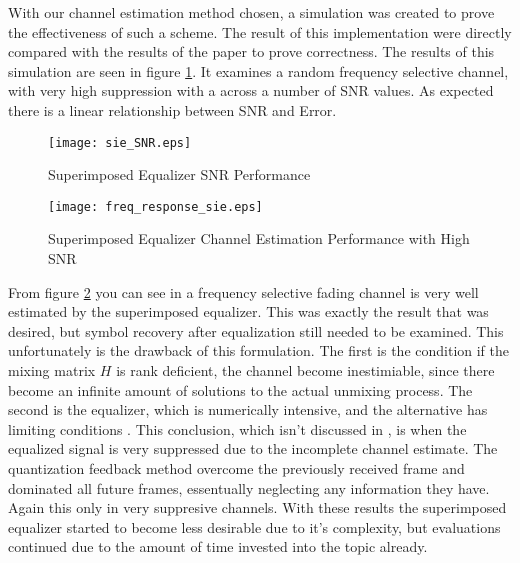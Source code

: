With our channel estimation method chosen, a simulation was created to prove the effectiveness of such a scheme.  The result of this implementation were directly compared with the results of the paper to prove correctness.%
The results of this simulation are seen in figure \ref{sie}.  It examines a random frequency selective channel, with very high suppression with a across a number of SNR values.  As expected there is a linear relationship between SNR and Error.\\  %

\begin{figure}[!ht]\label{sie}
\centering
\texttt{[image: sie\_SNR.eps]}
\caption{Superimposed Equalizer SNR Performance}
\end{figure}

\begin{figure}[!ht]\label{sie_freq}
\centering
\texttt{[image: freq\_response\_sie.eps]}
\caption{Superimposed Equalizer Channel Estimation Performance with High SNR}
\end{figure}

%

From figure \ref{sie_freq} you can see in a frequency selective fading channel is very well estimated by the superimposed equalizer.  This was exactly the result that was desired, but symbol recovery after equalization still needed to be examined. This unfortunately is the drawback of this formulation.  The first is the condition if the mixing matrix \(H\) is rank deficient, the channel become inestimiable,  since there become an infinite amount of solutions to the actual unmixing process.  The second is the equalizer, which is numerically intensive, and the alternative has limiting conditions \cite{Ghogho}.  This conclusion, which isn't discussed in \cite{Ghogho}, is when the equalized signal is very suppressed due to the incomplete channel estimate.  The quantization feedback method overcome the previously received frame and dominated all future frames, essentually neglecting any information they have.  Again this only in very suppresive channels.  With these results the superimposed equalizer started to become less desirable due to it's complexity, but evaluations continued due to the amount of time invested into the topic already.\\

